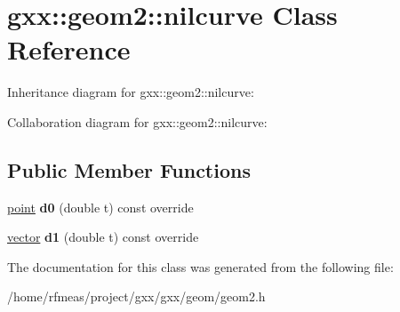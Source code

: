 \hypertarget{classgxx_1_1geom2_1_1nilcurve}{}\section{gxx\+:\+:geom2\+:\+:nilcurve Class Reference}
\label{classgxx_1_1geom2_1_1nilcurve}


Inheritance diagram for gxx\+:\+:geom2\+:\+:nilcurve\+:


Collaboration diagram for gxx\+:\+:geom2\+:\+:nilcurve\+:
\subsection*{Public Member Functions}
\begin{DoxyCompactItemize}
\item 
\hyperlink{classmalgo_1_1vector2}{point} {\bfseries d0} (double t) const override\hypertarget{classgxx_1_1geom2_1_1nilcurve_a87d12be5a44bd9fabbde96afbc007cba}{}\label{classgxx_1_1geom2_1_1nilcurve_a87d12be5a44bd9fabbde96afbc007cba}

\item 
\hyperlink{classmalgo_1_1vector2}{vector} {\bfseries d1} (double t) const override\hypertarget{classgxx_1_1geom2_1_1nilcurve_a3fa9ccda42e598dc9311410d81bfa897}{}\label{classgxx_1_1geom2_1_1nilcurve_a3fa9ccda42e598dc9311410d81bfa897}

\end{DoxyCompactItemize}


The documentation for this class was generated from the following file\+:\begin{DoxyCompactItemize}
\item 
/home/rfmeas/project/gxx/gxx/geom/geom2.\+h\end{DoxyCompactItemize}

